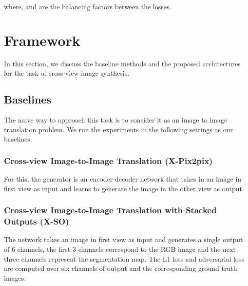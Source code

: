 \documentclass[times,twocolumn,final,authoryear]{elsarticle_modified}
\begin{document}
\vspace{-15pt}


where,  and  are the balancing factors between the losses. 







    






 \vspace{-5pt}
\section{Framework}
\label{sec:framework}
In this section, we discuss the baseline methods and the proposed architectures for the task of cross-view image synthesis. 


\subsection{Baselines}

The naive way to approach this task is to consider it as an image to image translation problem. We run the experiments in the following settings as our baselines. 


\vspace{-5pt}

\subsubsection{Cross-view Image-to-Image Translation (X-Pix2pix)}
For this, the generator is an encoder-decoder network that takes in an image in first view as input and learns to generate the image in the other view as output. 


\vspace{-5pt}

\subsubsection{Cross-view Image-to-Image Translation with Stacked Outputs (X-SO)} 
The network takes an image in first view as input and generates a single output of 6 channels, the first 3 channels correspond to the RGB image and the next three channels represent the segmentation map. The L1 loss and adversarial loss are computed over six channels of output and the corresponding ground truth images.
\end{document}
